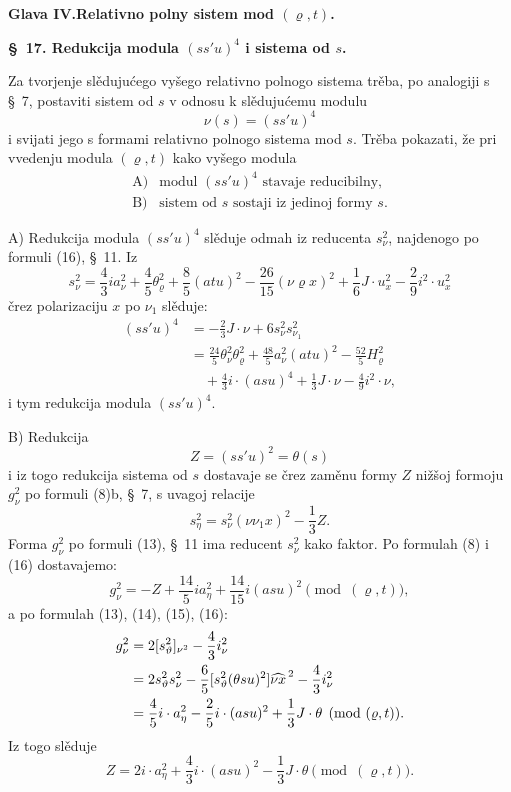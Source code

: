 \documentclass[11pt]{article}
\let\A\relax
\newcommand{\A}{\mathfrak A}
\begin{document}
\begin{center}
{\Large\bfseries Glava IV.\quad Relativno polny sistem mod $(\varrho,t)$.}
\end{center}

\begin{center}
\textbf{\S\ 17. \quad Redukcija modula $(ss'u)^4$ i sistema od $s$.}
\end{center}

Za tvorjenje slědujućego vyšego relativno polnogo sistema trěba, po analogiji s \S\ 7, postaviti sistem od $s$ v odnosu k slědujućemu modulu
\[
\nu(s)=(ss'u)^4
\]
i svijati jego s formami relativno polnogo sistema mod $s$. Trěba pokazati, že pri vvedenju modula $(\varrho,t)$ kako vyšego modula
\[
\begin{array}{ll}
\mathrm{A)}&\text{modul }(ss'u)^4\text{ stavaje reducibilny,}\\
\mathrm{B)}&\text{sistem od }s\text{ sostaji iz jedinoj formy }s.
\end{array}
\]

\noindent A) Redukcija modula $(ss'u)^4$ slěduje odmah iz reducenta $s_\nu^2$, najdenogo po formuli (16), \S\ 11. Iz
\[
 s_\nu^2=\frac43 i a_\nu^2+\frac45\theta_\varrho^2+\frac85(atu)^2-
 \frac{26}{15}(\nu\varrho x)^2+\frac16J\cdot u_x^2-
 \frac29i^2\cdot u_x^2
\]
črez polarizaciju $x$ po $\nu_1$ slěduje:
\[
\tag{21}
\begin{aligned}
(ss'u)^4&=-\frac23J\cdot\nu+6s_\nu^2s_{\nu_1}^2\\
&=\frac{24}{5}\theta_\nu^2\theta_\varrho^2+
\frac{48}{5}a_\nu^2(atu)^2-
\frac{52}{5}H_\varrho^2\\
&\quad+\frac43i\cdot(asu)^4+\frac13J\cdot\nu-
\frac49i^2\cdot\nu,
\end{aligned}
\]
i tym redukcija modula $(ss'u)^4$.


\noindent B) Redukcija
\[
Z=(ss'u)^2=\theta(s)
\]
i iz togo redukcija sistema od $s$ dostavaje se črez zaměnu formy $Z$ nižšoj formoju $g_\nu^2$ po formuli (8)b, \S\ 7, s uvagoj relacije
\[
 s_\eta^2=s_\nu^2(\nu\nu_1x)^2-\frac13Z.
\]
Forma $g_\nu^2$ po formuli (13), \S\ 11 ima reducent $s_\nu^2$ kako faktor. Po formulah (8) i (16) dostavajemo:
\[
 g_\nu^2=-Z+\frac{14}{5}ia_\eta^2+\frac{14}{15}i(asu)^2
 \pmod{(\varrho,t)},
\]
a po formulah (13), (14), (15), (16):
\[
\begin{aligned}
g_\nu^2&=2[s_\vartheta^2]_{\nu^2}-\frac43 i\A_\nu^2\\
&=2s_\vartheta^2s_\nu^2-\frac65[s_\vartheta^2(\theta su)^2]\widehat{\nu x}^{\,2}
        -\frac43i\A_\nu^2\\
&=\frac45i\cdot a_\eta^2-\frac25i\cdot(asu)^2+\frac13J\cdot\theta
\pmod{(\varrho,t)}.
\end{aligned}
\]
Iz togo slěduje
\[
\tag{23}
 Z=2i\cdot a_\eta^2+\frac43i\cdot(asu)^2-\frac13J\cdot\theta
 \pmod{(\varrho,t)}.
\]
\end{document}
